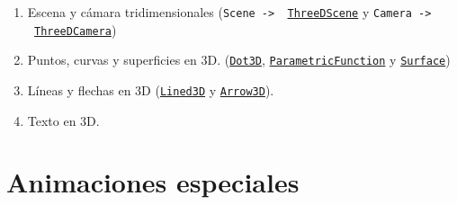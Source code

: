 \documentclass[a4paper]{article}
\begin{document}
\begin{enumerate}

    \item Escena y cámara tridimensionales (\texttt{Scene -> \ \href{https://docs.manim.community/en/v0.16.0.post0/reference/manim.scene.three_d_scene.ThreeDScene.html?highlight=ThreeDScene}{ThreeDScene}} y \texttt{Camera -> \ \href{https://docs.manim.community/en/v0.16.0.post0/reference/manim.camera.three_d_camera.ThreeDCamera.html?highlight=ThreeDCamera}{ThreeDCamera}})

    \item Puntos, curvas y superficies en 3D. (\href{https://docs.manim.community/en/v0.16.0.post0/reference/manim.mobject.three_d.three_dimensions.Dot3D.html?highlight=Dot3D}{\texttt{Dot3D}}, \href{https://docs.manim.community/en/v0.16.0.post0/reference/manim.mobject.graphing.functions.ParametricFunction.html?highlight=ParametricFunction#threedparametricspring}{\texttt{ParametricFunction}} y \href{https://docs.manim.community/en/v0.16.0.post0/reference/manim.mobject.three_d.three_dimensions.Surface.html?highlight=Curve3D}{\texttt{Surface}})

    \item Líneas y flechas en 3D (\href{https://docs.manim.community/en/v0.16.0.post0/reference/manim.mobject.three_d.three_dimensions.Line3D.html?highlight=Line3D}{\texttt{Lined3D}} y \href{https://docs.manim.community/en/v0.16.0.post0/reference/manim.mobject.three_d.three_dimensions.Arrow3D.html?highlight=Arrow3D}{\texttt{Arrow3D}}).

    \item Texto en 3D.
\end{enumerate}

\section{Animaciones especiales} \label{Sec: Animaciones especiales}
\end{document}
